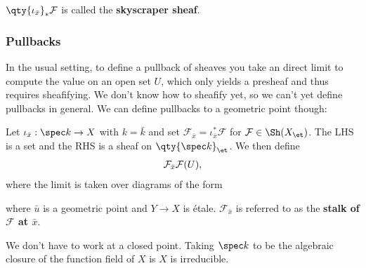 \begin{definition}

\(\qty{\iota_{\bar x}}_* \mathcal{F}\) is called the \textbf{skyscraper
sheaf}.

\end{definition}

\hypertarget{pullbacks}{%
\subsubsection{Pullbacks}\label{pullbacks}}

In the usual setting, to define a pullback of sheaves you take an direct
limit to compute the value on an open set \(U\), which only yields a
presheaf and thus requires sheafifying. We don't know how to sheafify
yet, so we can't yet define pullbacks in general. We can define
pullbacks to a geometric point though:

\begin{definition}[Pullbacks]

Let \(\iota_{\bar x}: \spec k \to X\) with \(k = \bar k\) and set
\(\mathcal{F}_{\bar x} = \iota_{\bar x}^* \mathcal{F}\) for
\(\mathcal{F}\in \Sh(X_{\et})\). The LHS is a set and the RHS is a sheaf
on \(\qty{\spec k}_{\et}\). We then define
\begin{align*}  
\mathcal{F}_{\bar x} \def \directlim_{(U, u)} \mathcal{F}(U)
,\end{align*} where the limit is taken over diagrams of the form

\begin{center}
\end{center}

where \(\bar u\) is a geometric point and \(Y\to X\) is étale.
\(\mathcal{F}_{\bar x}\) is referred to as the \textbf{stalk of
\(\mathcal{F}\) at \(\bar x\)}.

\end{definition}

\begin{remark}

We don't have to work at a closed point. Taking \(\spec k\) to be the
algebraic closure of the function field of \(X\) is \(X\) is
irreducible.

\end{remark}

